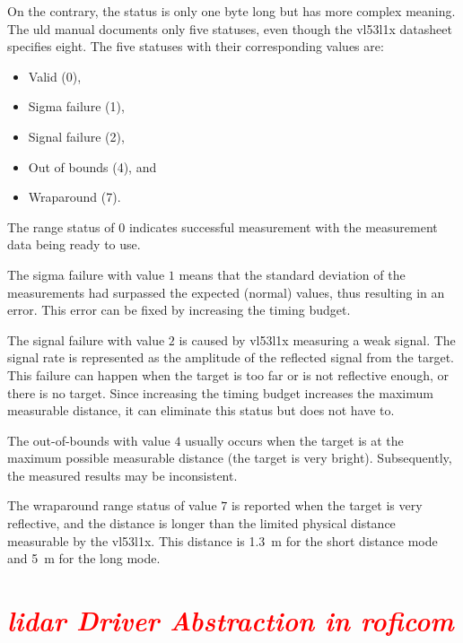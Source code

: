 \documentclass[
  digital,     %
  oneside,     %
  nosansbold,  %
  nocolorbold, %
  nolof,         %
  nolot,         %
]{fithesis4}
\newcommand{\TODO}[1]{\textcolor{red}{\textit{#1}}}
\begin{document}
{{{On the contrary, the status is only one byte long but has more complex meaning. The \acrshort{uld} manual \cite{um2510} documents only five statuses, even though the \gls{vl53l1x} datasheet \cite{vl53l1x} specifies eight. The five statuses with their corresponding values are:
\begin{itemize}
    \item Valid (0),
    \item Sigma failure (1),
    \item Signal failure (2),
    \item Out of bounds (4), and
    \item Wraparound (7).
\end{itemize}

The range status of $0$ indicates successful measurement with the measurement data being ready to use.

The sigma failure with value $1$ means that the standard deviation of the measurements had surpassed the expected (normal) values, thus resulting in an error. This error can be fixed by increasing the timing budget.

The signal failure with value $2$ is caused by \gls{vl53l1x} measuring a weak signal. The signal rate is represented as the amplitude of the reflected signal from the target. This failure can happen when the target is too far or is not reflective enough, or there is no target. Since increasing the timing budget increases the maximum measurable distance, it can eliminate this status but does not have to.

The out-of-bounds with value $4$ usually occurs when the target is at the maximum possible measurable distance (the target is very bright). Subsequently, the measured results may be inconsistent.

The wraparound range status of value $7$ is reported when the target is very reflective, and the distance is longer than the limited physical distance measurable by the \gls{vl53l1x}. This distance is \qty{1.3}{\metre} for the short distance mode and \qty{5}{\metre} for the long mode.

\section[ LiDAR Diver ]{ \TODO{ \acrshort{lidar} Driver Abstraction in \acrshort{roficom} } } \label{sec:lidar-driver}

}}}
\end{document}
